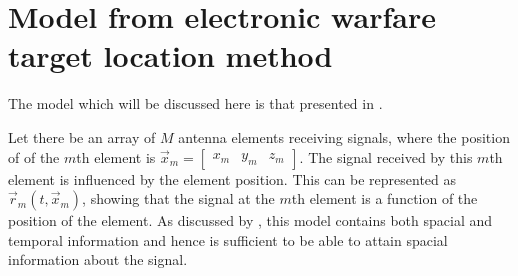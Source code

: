 \section{Model from electronic warfare target location method}

The model which will be discussed here is that presented in \cite{poisel2012electronic}.  

Let there be an array of $M$ antenna elements receiving signals, where the position of of the \(m\)th element is \(\vec{x}_{m} = \begin{bmatrix}x_m & y_m & z_m \end{bmatrix}\).
The signal received by this \(m\)th element is influenced by the element position. 
This can be represented as \(\vec{r}_m(t, \vec{x}_m)\), showing that the signal at the \(m\)th element is a function of the position of the element.
As discussed by \cite{krim1996two}, this model contains both spacial and temporal information and hence is sufficient to be able to attain spacial information about the signal. 

